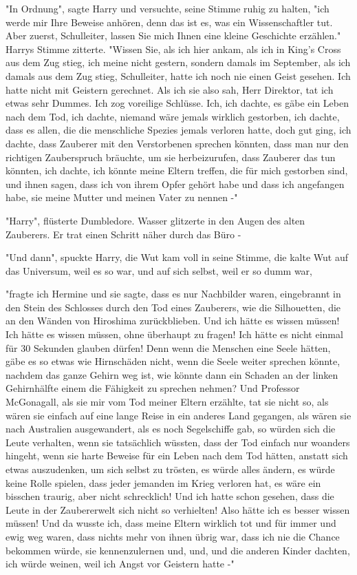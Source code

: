 {"In Ordnung", sagte Harry und versuchte, seine Stimme ruhig zu halten, "ich werde mir Ihre Beweise anhören, denn das ist es, was ein Wissenschaftler tut. Aber zuerst, Schulleiter, lassen Sie mich Ihnen eine kleine Geschichte erzählen." Harrys Stimme zitterte. "Wissen Sie, als ich hier ankam, als ich in King's Cross aus dem Zug stieg, ich meine nicht gestern, sondern damals im September, als ich damals aus dem Zug stieg, Schulleiter, hatte ich noch nie einen Geist gesehen. Ich hatte nicht mit Geistern gerechnet. Als ich sie also sah, Herr Direktor, tat ich etwas sehr Dummes. Ich zog voreilige Schlüsse. Ich, ich dachte, es gäbe ein Leben nach dem Tod, ich dachte, niemand wäre jemals wirklich gestorben, ich dachte, dass es allen, die die menschliche Spezies jemals verloren hatte, doch gut ging, ich dachte, dass Zauberer mit den Verstorbenen sprechen könnten, dass man nur den richtigen Zauberspruch bräuchte, um sie herbeizurufen, dass Zauberer das tun könnten, ich dachte, ich könnte meine Eltern treffen, die für mich gestorben sind, und ihnen sagen, dass ich von ihrem Opfer gehört habe und dass ich angefangen habe, sie meine Mutter und meinen Vater zu nennen -"

"Harry", flüsterte Dumbledore. Wasser glitzerte in den Augen des alten Zauberers. Er trat einen Schritt näher durch das Büro -

"Und dann", spuckte Harry, die Wut kam voll in seine Stimme, die kalte Wut auf das Universum, weil es so war, und auf sich selbst, weil er so dumm war,

"fragte ich Hermine und sie sagte, dass es nur Nachbilder waren, eingebrannt in den Stein des Schlosses durch den Tod eines Zauberers, wie die Silhouetten, die an den Wänden von Hiroshima zurückblieben. Und ich hätte es wissen müssen! Ich hätte es wissen müssen, ohne überhaupt zu fragen! Ich hätte es nicht einmal für 30 Sekunden glauben dürfen! Denn wenn die Menschen eine Seele hätten, gäbe es so etwas wie Hirnschäden nicht, wenn die Seele weiter sprechen könnte, nachdem das ganze Gehirn weg ist, wie könnte dann ein Schaden an der linken Gehirnhälfte einem die Fähigkeit zu sprechen nehmen? Und Professor McGonagall, als sie mir vom Tod meiner Eltern erzählte, tat sie nicht so, als wären sie einfach auf eine lange Reise in ein anderes Land gegangen, als wären sie nach Australien ausgewandert, als es noch Segelschiffe gab, so würden sich die Leute verhalten, wenn sie tatsächlich wüssten, dass der Tod einfach nur woanders hingeht, wenn sie harte Beweise für ein Leben nach dem Tod hätten, anstatt sich etwas auszudenken, um sich selbst zu trösten, es würde alles ändern, es würde keine Rolle spielen, dass jeder jemanden im Krieg verloren hat, es wäre ein bisschen traurig, aber nicht schrecklich! Und ich hatte schon gesehen, dass die Leute in der Zaubererwelt sich nicht so verhielten! Also hätte ich es besser wissen müssen! Und da wusste ich, dass meine Eltern wirklich tot und für immer und ewig weg waren, dass nichts mehr von ihnen übrig war, dass ich nie die Chance bekommen würde, sie kennenzulernen und, und, und die anderen Kinder dachten, ich würde weinen, weil ich Angst vor Geistern hatte -"

}
